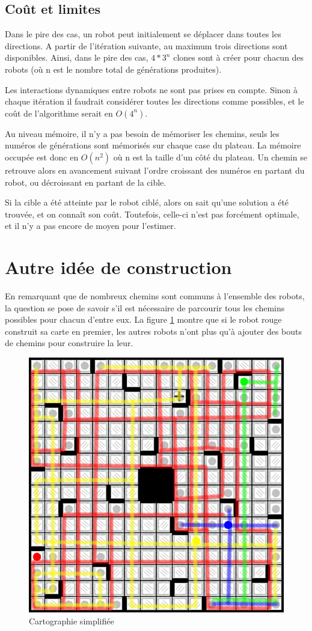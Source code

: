 \documentclass[a4paper,11pt]{article}
\begin{document}
\subsection{Co\^ut et limites}
Dans le pire des cas, un robot peut initialement se d\'eplacer dans toutes les directions. A partir de l'it\'eration suivante, au maximum trois directions sont disponibles. Ainsi, dans le pire des cas, $4*3^n$ clones sont \`a cr\'eer pour chacun des robots (o\`u n est le nombre total de g\'en\'erations produites).
\par Les interactions dynamiques entre robots ne sont pas prises en compte. Sinon \`a chaque it\'eration il faudrait consid\'erer toutes les directions comme possibles, et le co\^ut de l'algorithme serait en $O(4^n)$.
\par Au niveau m\'emoire, il n'y a pas besoin de m\'emoriser les chemins, seuls les num\'eros de g\'en\'erations sont m\'emoris\'es sur chaque case du plateau. La m\'emoire occup\'ee est donc en $O(n^2)$ o\`u n est la taille d'un c\^ot\'e du plateau. Un chemin se retrouve alors en avancement suivant l'ordre croissant des num\'eros en partant du robot, ou d\'ecroissant en partant de la cible.
\par Si la cible a \'et\'e atteinte par le robot cibl\'e, alors on sait qu'une solution a \'et\'e trouv\'ee, et on conna\^it son co\^ut. Toutefois, celle-ci n'est pas forc\'ement optimale, et il n'y a pas encore de moyen pour l'estimer.

\newpage
\section{Autre id\'ee de construction}
En remarquant que de nombreux chemins sont communs \`a l'ensemble des robots, la question se pose de savoir s'il est n\'ecessaire de parcourir tous les chemins possibles pour chacun d'entre eux. La figure \ref{fig:itineraire} montre que si le robot rouge construit sa carte en premier, les autres robots n'ont plus qu'\`a ajouter des bouts de chemins pour construire la leur.

\begin{figure}[htbp]
    \centering
    \includegraphics[width=.7\linewidth]{img/chemins_initiaux.png}
    \caption{Cartographie simplifi\'ee}
    \label{fig:itineraire}
  \end{figure}
\end{document}
